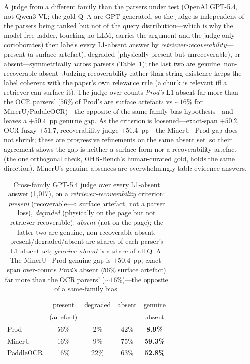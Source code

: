 \documentclass[11pt]{article}
\begin{document}
A judge from a different family than the parsers under test (OpenAI GPT-5.4, not Qwen3-VL; the gold Q--A are GPT-generated, so the judge is independent of the parsers being ranked but not of the query distribution---which is why the model-free ladder, touching no LLM, carries the argument and the judge only corroborates) then labels every L1-absent answer by \emph{retriever-recoverability}---present (a surface artefact), degraded (physically present but unrecoverable), or absent---symmetrically across parsers (Table~\ref{tab:judge}); the last two are genuine, non-recoverable absent. Judging recoverability rather than string existence keeps the label coherent with the paper's own relevance rule (a chunk is relevant iff a retriever can surface it). The judge over-counts \emph{Prod's} L1-absent far more than the OCR parsers' ($56\%$ of Prod's are surface artefacts vs $\sim\!16\%$ for MinerU/PaddleOCR)---the opposite of the same-family-bias hypothesis---and leaves a $+50.4$~pp genuine gap. As the criterion is loosened---exact-span $+50.2$, OCR-fuzzy $+51.7$, recoverability judge $+50.4$~pp---the MinerU$-$Prod gap does not shrink; these are progressive refinements on the same absent set, so their agreement shows the gap is neither a surface-form nor a recoverability artefact (the one orthogonal check, OHR-Bench's human-curated gold, holds the same direction). MinerU's genuine absences are overwhelmingly table-evidence answers.

\begin{table}[h]
\centering\footnotesize
\setlength{\tabcolsep}{3pt}
\begin{tabular}{lcccc}
\toprule
& present & degraded & absent & genuine \\
& (artefact) & & & absent \\
\midrule
Prod & 56\% & 2\% & 42\% & \textbf{8.9\%} \\
MinerU & 16\% & 9\% & 75\% & \textbf{59.3\%} \\
PaddleOCR & 16\% & 22\% & 63\% & \textbf{52.8\%} \\
\bottomrule
\end{tabular}
\caption{Cross-family GPT-5.4 judge over every L1-absent answer (1{,}017), on a \emph{retriever-recoverability} criterion: \emph{present} (recoverable---a surface artefact, not a parser loss), \emph{degraded} (physically on the page but not retriever-recoverable), \emph{absent} (not on the page); the latter two are genuine, non-recoverable absent. present/degraded/absent are shares of each parser's L1-absent set; \emph{genuine absent} is a share of all Q--A. The MinerU$-$Prod genuine gap is $+50.4$~pp; exact-span over-counts \emph{Prod's} absent (56\% surface artefact) far more than the OCR parsers' ($\sim\!16\%$)---the opposite of a same-family bias.}
\label{tab:judge}
\end{table}
\end{document}
